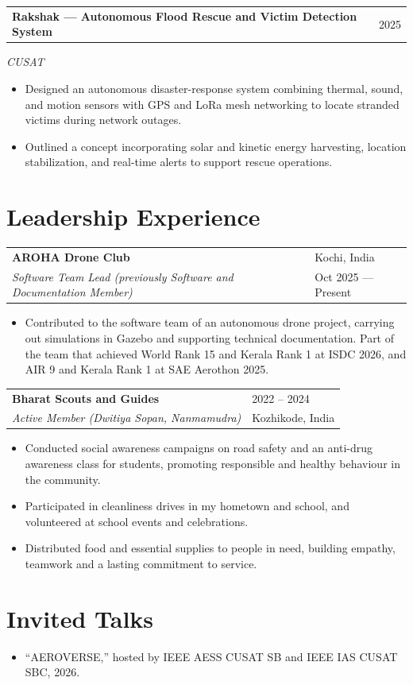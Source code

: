 \documentclass[10pt,a4paper]{extarticle}
\makeatletter
\newcommand{\entry}[4]{%
  \begin{tabularx}{\textwidth}{@{}X>{\raggedleft\arraybackslash}p{4.2cm}@{}}
    \textbf{#1} & \textcolor{muted}{#2}\\[-1pt]
    \textit{#3} & {\textcolor{muted}{#4}}
  \end{tabularx}\vspace{-2pt}
}
\newcommand{\project}[3]{%
  \begin{tabularx}{\textwidth}{@{}X>{\raggedleft\arraybackslash}p{1.1cm}@{}}
    \textbf{#1} & \textcolor{muted}{#2}
  \end{tabularx}
  {\textit{\textcolor{muted}{#3}}}\vspace{-2pt}
}
\makeatother
\begin{document}
\project{Rakshak --- Autonomous Flood Rescue and Victim Detection System   }{2025}{CUSAT}
\begin{itemize}
  \item Designed an autonomous disaster-response system combining thermal, sound, and motion sensors with GPS and LoRa mesh networking to locate stranded victims during network outages.
  \item Outlined a concept incorporating solar and kinetic energy harvesting, location stabilization, and real-time alerts to support rescue operations.

\end{itemize}






\newpage

\section{Leadership Experience}
\entry{AROHA Drone Club}{Kochi, India}{Software Team Lead (previously Software and Documentation Member)}{Oct 2025 --- Present}
\begin{itemize}
  \item Contributed to the software team of an autonomous drone project, carrying out simulations in Gazebo and supporting technical documentation. Part of the team that achieved World Rank 15 and Kerala Rank 1 at ISDC 2026, and AIR 9 and Kerala Rank 1 at SAE Aerothon 2025.

\end{itemize}

\vspace{4pt}
\entry{Bharat Scouts and Guides}{2022 -- 2024}{Active Member (Dwitiya Sopan, Nanmamudra)}{Kozhikode, India}
\begin{itemize}
  \item Conducted social awareness campaigns on road safety and an anti-drug awareness class for students, promoting responsible and healthy behaviour in the community.
  \item Participated in cleanliness drives in my hometown and school, and volunteered at school events and celebrations.
  \item Distributed food and essential supplies to people in need, building empathy, teamwork and a lasting commitment to service.
\end{itemize}


\section{Invited Talks}
\begin{itemize}
  \item ``AEROVERSE,'' hosted by IEEE AESS CUSAT SB and IEEE IAS CUSAT SBC, 2026.
\end{itemize}
\end{document}
